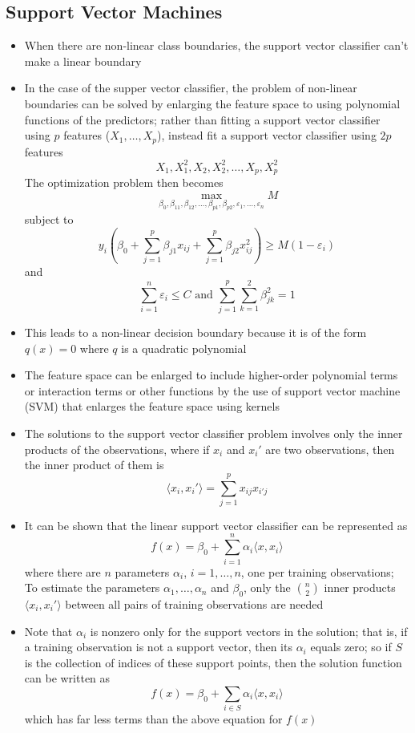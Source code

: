 \documentclass[12pt]{article}
\begin{document}
\subsection{Support Vector Machines}
\begin{itemize} 
\item When there are non-linear class boundaries, the support vector classifier can't make a linear boundary
\item In the case of the supper vector classifier, the problem of non-linear boundaries can be solved by enlarging the feature space to using polynomial functions of the predictors; rather than fitting a support vector classifier using $p$ features ($X_1,\dots,X_p$), instead fit a support vector classifier using $2p$ features $$ X_1, X_1^2,X_2,X_2^2,\dots,X_p,X_p^2 $$ 
The optimization problem then becomes $$ \max_{\beta_0,\beta_{11},\beta_{12},\dots,\beta_{p1},\beta_{p2},\varepsilon_1,\dots,\varepsilon_n} M $$ subject to $$ y_i \left( \beta_0 + \sum_{j=1}^p \beta_{j1}x_{ij} + \sum_{j=1}^p \beta_{j2}x_{ij}^2 \right) \geq M(1 - \varepsilon_i) $$ and $$ \sum_{i=1}^n \varepsilon_i \leq C \text{ and } \sum_{j=1}^p \sum_{k=1}^2 \beta_{jk}^2 = 1 $$ 
\item This leads to a non-linear decision boundary because it is of the form $q(x) = 0$ where $q$ is a quadratic polynomial 
\item The feature space can be enlarged to include higher-order polynomial terms or interaction terms or other functions by the use of support vector machine (SVM) that enlarges the feature space using kernels
\item The solutions to the support vector classifier problem involves only the inner products of the observations, where if $x_i$ and $x_i'$ are two observations, then the inner product of them is $$ \langle x_i, x_i' \rangle = \sum_{j=1}^p x_{ij}x_{i'j} $$ 
\item It can be shown that the linear support vector classifier can be represented as $$ f(x) = \beta_0 + \sum_{i=1}^n \alpha_i \langle x, x_i \rangle $$ where there are $n$ parameters $\alpha_i$, $i = 1,\dots,n$, one per training observations; To estimate the parameters $\alpha_1,\dots,\alpha_n$ and $\beta_0$, only the $\binom{n}{2}$ inner products $\langle x_i, x_i' \rangle$ between all pairs of training observations are needed 
\item Note that $\alpha_i$ is nonzero only for the support vectors in the solution; that is, if a training observation is not a support vector, then its $\alpha_i$ equals zero; so if $S$ is the collection of indices of these support points, then the solution function can be written as $$ f(x) = \beta_0 + \sum_{i \in S} \alpha_i \langle x, x_i \rangle $$ which has far less terms than the above equation for $f(x)$ 

\end{itemize}
\end{document}
